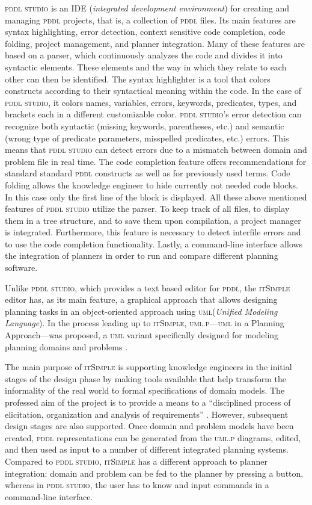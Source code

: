 \documentclass[runningheads]{llncs}
\newcommand{\pddlstudio}{\textsc{pddl studio}\xspace}
\newcommand{\itsimple}{\textsc{itSimple}\xspace}
\newcommand{\pddl}{\textsc{pddl}\xspace}
\newcommand{\uml}{\textsc{uml}\xspace}
\begin{document}
\pddlstudio \cite{chomuttool,plch2012inspect} is an IDE
(\emph{integrated development environment}) for creating and managing
\textsc{pddl} projects, that is, a collection of \textsc{pddl}
files. Its main features are syntax highlighting, error detection,
context sensitive code completion, code folding, project management,
and planner integration. Many of these features are based on a parser,
which continuously analyzes the code and divides it into syntactic
elements. These elements and the way in which they relate to each
other can then be identified. The syntax highlighter is a tool that
colors constructs according to their syntactical meaning within the
code. In the case of \pddlstudio, it colors names, variables, errors,
keywords, predicates, types, and brackets each in a different
customizable color.  \pddlstudio's error detection can recognize both
syntactic (missing keywords, parentheses, etc.) and semantic (wrong
type of predicate parameters, misspelled predicates, etc.)
errors. This means that \pddlstudio can detect errors due to a
mismatch between domain and problem file in real time. The code
completion feature offers recommendations for standard standard
\textsc{pddl} constructs as well as for previously used terms. Code
folding allows the knowledge engineer to hide currently not needed
code blocks. In this case only the first line of the block is
displayed. All these above mentioned features of \pddlstudio utilize
the parser. To keep track of all files, to display them in a tree
structure, and to save them upon compilation, a project manager is
integrated. Furthermore, this feature is necessary to detect interfile
errors and to use the code completion functionality. Lastly, a
command-line interface allows the integration of planners in order to
run and compare different planning software.

Unlike \pddlstudio, which provides a text based editor for \pddl, the
\itsimple \cite{vaquero2005itsimple} editor has, as its main feature,
a graphical approach that allows designing planning tasks in an
object-oriented approach using \uml (\emph{Unified Modeling
  Language}). In the process leading up to \itsimple,
\textsc{uml.p}---\textsc{uml} in a Planning Approach---was proposed, a
\textsc{uml} variant specifically designed for modeling planning
domains and problems \cite{vaquero2006use}.

The main purpose of \itsimple is supporting knowledge
engineers in the initial stages of the design phase by making tools
available that help transform the informality of the real world to
formal specifications of domain models. The professed aim of the
project is to provide a means to a \enquote{disciplined process of
  elicitation, organization and analysis of requirements}
\cite{vaquero2005itsimple}. However, subsequent design stages are also
supported. Once domain and problem models have been created,
\textsc{pddl} representations can be generated from the \textsc{uml.p}
diagrams, edited, and then used as input to a number of different
integrated planning systems. Compared to \pddlstudio, \itsimple has a
different approach to planner integration: domain and problem can be
fed to the planner by pressing a button, whereas in \pddlstudio, the
user has to know and input commands in a command-line interface.
\end{document}
